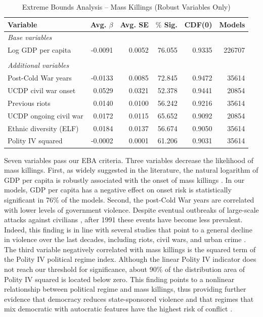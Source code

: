 \begin{table}[H]
\centering
\begin{tabular}{lrrrrr}
\hline
\textbf{Variable} & \textbf{Avg. $\beta$} & \textbf{Avg. SE} & \textbf{$\%$ Sig.} & \textbf{CDF(0)} & \textbf{Models} \\ \hline
\textit{Base variables} &  &  &  &  &  \\
Log GDP per capita & -0.0091 & 0.0052 & 76.055 & 0.9335 & 226707 \\
 &  &  &  &  &  \\
\textit{Additional variables} &  &  &  &  &  \\
Post-Cold War years & -0.0133 & 0.0085 & 72.845 & 0.9472 & 35614 \\
UCDP civil war onset & 0.0529 & 0.0321 & 52.378 & 0.9441 & 20854 \\
Previous riots & 0.0140 & 0.0100 & 56.242 & 0.9216 & 35614 \\
UCDP ongoing civil war & 0.0172 & 0.0115 & 65.652 & 0.9092 & 20854 \\
Ethnic diversity (ELF) & 0.0184 & 0.0137 & 56.674 & 0.9050 & 35614 \\
Polity IV squared & -0.0002 & 0.0001 & 61.206 & 0.9031 & 35614 \\ \hline
\end{tabular}
\caption{Extreme Bounds Analysis -- Mass Killings (Robust Variables Only)}
\label{tab:eba1}
\end{table}

Seven variables pass our EBA criteria. Three variables decrease the likelihood of mass killings. First, as widely suggested in the literature, the natural logarithm of GDP per capita is robustly associated with the onset of mass killings 
\citep[e.g.,][]{besanccon2005relative, easterly2006development,esteban2015strategic}. In our models, GDP per capita has a negative effect on onset risk is statistically significant in 76\% of the models. Second, the post-Cold War years are correlated with lower levels of government violence. Despite eventual outbreaks of large-scale attacks against civilians \citep[e.g.,][]{prunier2005darfur,tatum2010genocide,waldorf2009revisiting}, after 1991 these events have become less prevalent. Indeed, this finding is in line with several studies that point to a general decline in violence over the last decades, including riots, civil wars, and urban crime \citep{eisner2003long,pinker2011better}. The third variable negatively correlated with mass killings is the squared term of the Polity IV political regime index. Although the linear Polity IV indicator does not reach our threshold for significance, about 90\% of the distribution area of Polity IV squared is located below zero. This finding points to a nonlinear relationship between political regime and mass killings, thus providing further evidence that democracy reduces state-sponsored violence \citep{rost2013will,rummel1995democracy} and that regimes that mix democratic with autocratic features have the highest risk of conflict \citep{hegre2001toward,mitchell2013domestic,muchlinski2014grievances,regan2010changing}.

